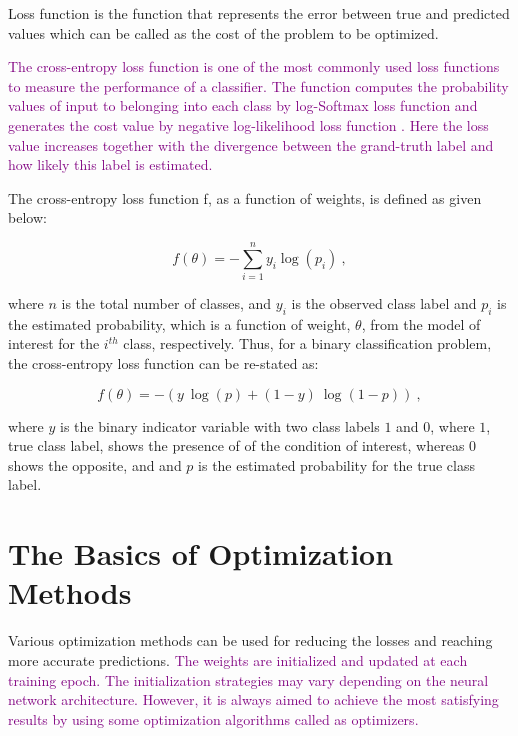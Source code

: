 Loss function is the function that represents the error between true and predicted values which can be called as the cost of the problem to be optimized.

\textcolor{purple}{The cross-entropy loss function is one of the most commonly used loss functions to measure the performance of a classifier. The function computes the probability values of input to belonging into each class by log-Softmax loss function \cite{logsoftmax} and generates the cost value by negative log-likelihood loss function \cite{negative-ll}. Here the loss value increases together with the divergence between the grand-truth label and how likely this label is estimated.}

The cross-entropy loss function f, as a function of weights, is defined as given below:

\begin{equation}
\label{eq:cross_entropy_loss_formulae}
    f(\theta) = - \sum_{i=1}^{n} y_{i} \log(p_{i}) \:,
\end{equation}

where $n$ is the total number of classes, and $y_{i}$ is the observed class label and $p_{i}$ is the estimated probability, which is a function of weight, $\theta$, from the model of interest for the $i^{th}$ class, respectively. Thus, for a binary classification problem, the cross-entropy loss function can be re-stated as:

\begin{equation}
\label{eq:binary_cross_entropy_loss_formulae}
    f(\theta) = - \left ( y\:\log(p) + (1 - y)\:\log(1-p) \right ) \:,
\end{equation}

where $y$ is the binary indicator variable with two class labels $1$ and $0$, where $1$, true class label, shows the presence of of the condition of interest, whereas $0$ shows the opposite, and and $p$ is the estimated probability for the true class label.

\section{The Basics of Optimization Methods}
\label{sec:CH3_the_basics_of_optimization}

Various optimization methods can be used for reducing the losses and reaching more accurate predictions. \textcolor{purple}{The weights are initialized and updated at each training epoch. The initialization strategies may vary depending on the neural network architecture. However, it is always aimed to achieve the most satisfying results by using some optimization algorithms called as optimizers.}

